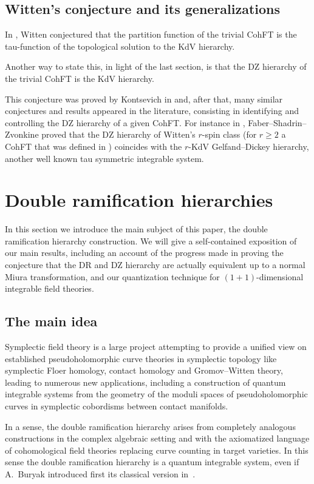 \documentclass[pdftex]{sigma}
\numberwithin{equation}{section}
\newcommand{\<}{\left<}
\renewcommand{\>}{\right>}
\begin{document}
\subsection{Witten's conjecture and its generalizations} In \cite{Wit91}, Witten conjectured that the partition function of the trivial CohFT is the tau-function of the topological solution to the KdV hierarchy.

Another way to state this, in light of the last section, is that the DZ hierarchy of the trivial CohFT is the KdV hierarchy.

This conjecture was proved by Kontsevich in \cite{Kon92} and, after that, many similar conjectures and results appeared in the literature, consisting in identifying and controlling the DZ hierarchy of a given CohFT. For instance in \cite{FSZ10}, Faber--Shadrin--Zvonkine proved that the DZ hierarchy of Witten's $r$-spin class (for $r\ge 2$ a CohFT that was def\/ined in \cite{PV00}) coincides with the $r$-KdV Gelfand--Dickey hierarchy, another well known tau symmetric integrable system.

\section{Double ramif\/ication hierarchies}\label{section:DRH}

In this section we introduce the main subject of this paper, the double ramif\/ication hierarchy construction. We will give a self-contained exposition of our main results, including an account of the progress made in proving the conjecture that the DR and DZ hierarchy are actually equivalent up to a normal Miura transformation, and our quantization technique for $(1+1)$-dimensional integrable f\/ield theories.

\subsection{The main idea} Symplectic f\/ield theory \cite{EGH00} is a large project attempting to provide a unif\/ied view on established pseudoholomorphic curve theories in symplectic topology like symplectic Floer homology, contact homology and Gromov--Witten theory, leading to numerous new applications, inclu\-ding a construction of quantum integrable systems from the geometry of the moduli spaces of pseudoholomorphic curves in symplectic cobordisms between contact manifolds.

In a sense, the double ramif\/ication hierarchy arises from completely analogous constructions in the complex algebraic setting and with the axiomatized language of cohomological f\/ield theories replacing curve counting in target varieties. In this sense the double ramif\/ication hierarchy is a quantum integrable system, even if A.~Buryak introduced f\/irst its classical version in~\cite{Bur15}.
\end{document}
